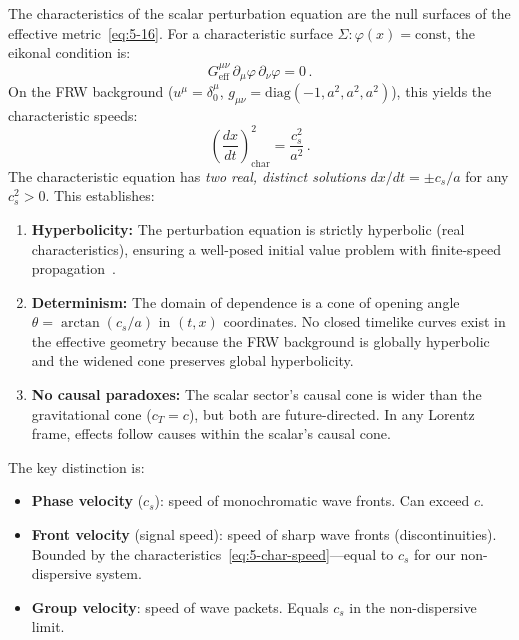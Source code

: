 The characteristics of the scalar perturbation equation are the null surfaces of the effective metric~\eqref{eq:5-16}. For a characteristic surface $\Sigma: \varphi(x) = \mathrm{const}$, the eikonal condition is:
\begin{equation}
  G^{\mu\nu}_\mathrm{eff}\,\partial_\mu\varphi\,\partial_\nu\varphi = 0\,.
  \label{eq:5-char-eikonal}
\end{equation}
On the FRW background ($u^\mu = \delta^\mu_0$, $g_{\mu\nu} = \mathrm{diag}(-1, a^2, a^2, a^2)$), this yields the characteristic speeds:
\begin{equation}
  \left(\frac{dx}{dt}\right)_{\!\mathrm{char}}^2 = \frac{c_s^2}{a^2}\,.
  \label{eq:5-char-speed}
\end{equation}
The characteristic equation has \emph{two real, distinct solutions} $dx/dt = \pm c_s/a$ for any $c_s^2 > 0$. This establishes:
\begin{enumerate}
  \item \textbf{Hyperbolicity:} The perturbation equation is strictly hyperbolic (real characteristics), ensuring a well-posed initial value problem with finite-speed propagation~\cite{ch5:Faraoni2009}.
  \item \textbf{Determinism:} The domain of dependence is a cone of opening angle $\theta = \arctan(c_s/a)$ in $(t, x)$ coordinates. No closed timelike curves exist in the effective geometry because the FRW background is globally hyperbolic and the widened cone preserves global hyperbolicity.
  \item \textbf{No causal paradoxes:} The scalar sector's causal cone is wider than the gravitational cone ($c_T = c$), but both are future-directed. In any Lorentz frame, effects follow causes within the scalar's causal cone.
\end{enumerate}

The key distinction is:
\begin{itemize}
\item \textbf{Phase velocity} ($c_s$): speed of monochromatic wave fronts. Can exceed $c$.
\item \textbf{Front velocity} (signal speed): speed of sharp wave fronts (discontinuities). Bounded by the characteristics~\eqref{eq:5-char-speed}---equal to $c_s$ for our non-dispersive system.
\item \textbf{Group velocity}: speed of wave packets. Equals $c_s$ in the non-dispersive limit.
\end{itemize}

